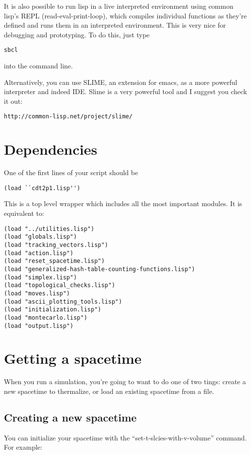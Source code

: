 \message{ !name(users_guide.tex)}\documentclass{article}
\begin{document}
It is also possible to run lisp in a live interpreted environment
using common lisp's REPL (read-eval-print-loop), which compiles
individual functions as they're defined and runs them in an
interpreted environment. This is very nice for debugging and
prototyping. To do this, just type
\begin{lstlisting}
sbcl
\end{lstlisting}
into the command line.

Alternatively, you can use SLIME, an extension for emacs, as a more
powerful interpreter and indeed IDE. Slime is a very powerful tool and
I suggest you check it out:
\begin{verbatim}
http://common-lisp.net/project/slime/
\end{verbatim}

\section{Dependencies}
One of the first lines of your script should be 
\begin{lstlisting}
(load ``cdt2p1.lisp'')
\end{lstlisting}
This is a top level wrapper which includes all the most important
modules. It is equivalent to:
\begin{lstlisting}
(load "../utilities.lisp")
(load "globals.lisp")
(load "tracking_vectors.lisp")
(load "action.lisp")
(load "reset_spacetime.lisp")
(load "generalized-hash-table-counting-functions.lisp")
(load "simplex.lisp")
(load "topological_checks.lisp")
(load "moves.lisp")
(load "ascii_plotting_tools.lisp")
(load "initialization.lisp")
(load "montecarlo.lisp")
(load "output.lisp")
\end{lstlisting}

\section{Getting a spacetime}

When you run a simulation, you're going to want to do one of two
tings: create a new spacetime to thermalize, or load an existing
spacetime from a file.

\subsection{Creating a new spacetime}

You can initialize your spacetime with the
``set-t-slcies-with-v-volume'' command. For example:
\end{document}
